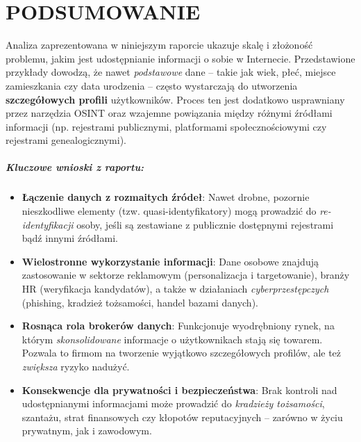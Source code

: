 \chapter{PODSUMOWANIE}

\noindent
Analiza zaprezentowana w niniejszym raporcie ukazuje skalę i złożoność problemu, jakim jest udostępnianie informacji o sobie w Internecie. Przedstawione przykłady dowodzą, że nawet \emph{podstawowe} dane – takie jak wiek, płeć, miejsce zamieszkania czy data urodzenia – często wystarczają do utworzenia \textbf{szczegółowych profili} użytkowników. Proces ten jest dodatkowo usprawniany przez narzędzia OSINT oraz wzajemne powiązania między różnymi źródłami informacji (np. rejestrami publicznymi, platformami społecznościowymi czy rejestrami genealogicznymi). 

\paragraph{Kluczowe wnioski z raportu:}
\begin{itemize}
    \item \textbf{Łączenie danych z rozmaitych źródeł}: Nawet drobne, pozornie nieszkodliwe elementy (tzw. quasi-identyfikatory) mogą prowadzić do \emph{re-identyfikacji} osoby, jeśli są zestawiane z publicznie dostępnymi rejestrami bądź innymi źródłami.
    \item \textbf{Wielostronne wykorzystanie informacji}: Dane osobowe znajdują zastosowanie w sektorze reklamowym (personalizacja i targetowanie), branży HR (weryfikacja kandydatów), a także w działaniach \emph{cyberprzestępczych} (phishing, kradzież tożsamości, handel bazami danych). 
    \item \textbf{Rosnąca rola brokerów danych}: Funkcjonuje wyodrębniony rynek, na którym \emph{skonsolidowane} informacje o użytkownikach stają się towarem. Pozwala to firmom na tworzenie wyjątkowo szczegółowych profilów, ale też \emph{zwiększa} ryzyko nadużyć.
    \item \textbf{Konsekwencje dla prywatności i bezpieczeństwa}: Brak kontroli nad udostępnianymi informacjami może prowadzić do \emph{kradzieży tożsamości}, szantażu, strat finansowych czy kłopotów reputacyjnych – zarówno w życiu prywatnym, jak i zawodowym.
\end{itemize}

